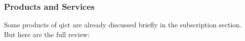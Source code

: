




\subsubsection{Products and Services}


Some products of \acrshort{qict} are already discussed briefly in the subscription section. But here are the full review:


